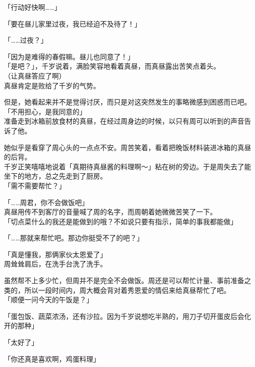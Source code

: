 「行动好快啊……」

「要在昼儿家里过夜，我已经迫不及待了！」

「……过夜？」

「因为是难得的春假嘛。昼儿也同意了！」\\

「是吧？」，千岁说着，满脸笑容地看着真昼，而真昼露出苦笑点着头。\\

（让真昼答应了啊）\\

真昼肯定是败给了千岁的气势。

但是，她看起来并不是觉得讨厌，而只是对这突然发生的事略微感到困惑而已吧。\\

「不用担心，是我同意的」\\

准备走到冰箱前放食材的真昼，在经过周身边的时候，以只有周可以听到的声音告诉了他。

她似乎是看穿了周心头的一点点不安。周苦笑着，看着把晚饭材料装进冰箱的真昼的后背。\\

千岁正笑嘻嘻地说着「真期待真昼酱的料理啊～」粘在树的旁边。于是周失去了能坐下的地方，总之先走到了厨房。\\

「需不需要帮忙？」

「……周君，你不会做饭吧」\\

真昼用传不到客厅的音量喊了周的名字，而周朝着她微微苦笑了一下。\\

「切点菜什么的我还是能做到的哦？不如说只要有指示，简单的事我都能做」

「……那就来帮忙吧。那边你挺受不了的吧？」

「真是懂我，那俩家伙太恩爱了」\\

周耸耸肩后，在洗手台洗了洗手。

虽然帮不上多少忙，但周并不是完全不会做饭。周还是可以帮忙计量、事前准备之类的，所以一段时间内，周大概会背对着秀恩爱的情侣来给真昼帮忙了吧。\\

「顺便一问今天的午饭是？」

「蛋包饭、蔬菜浓汤，还有沙拉。因为千岁说想吃半熟的，用刀子切开蛋皮后会化开的那种」

「太好了」

「你还真是喜欢啊，鸡蛋料理」

